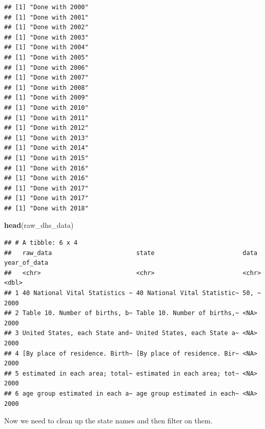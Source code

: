 \documentclass[
]{book}
\newenvironment{Shaded}{\begin{snugshade}}{\end{snugshade}}
\newcommand{\KeywordTok}[1]{\textcolor[rgb]{0.13,0.29,0.53}{\textbf{#1}}}
\newcommand{\NormalTok}[1]{#1}
\begin{document}
\begin{verbatim}
## [1] "Done with 2000"
## [1] "Done with 2001"
## [1] "Done with 2002"
## [1] "Done with 2003"
## [1] "Done with 2004"
## [1] "Done with 2005"
## [1] "Done with 2006"
## [1] "Done with 2007"
## [1] "Done with 2008"
## [1] "Done with 2009"
## [1] "Done with 2010"
## [1] "Done with 2011"
## [1] "Done with 2012"
## [1] "Done with 2013"
## [1] "Done with 2014"
## [1] "Done with 2015"
## [1] "Done with 2016"
## [1] "Done with 2016"
## [1] "Done with 2017"
## [1] "Done with 2017"
## [1] "Done with 2018"
\end{verbatim}

\begin{Shaded}
\begin{Highlighting}[]
\KeywordTok{head}\NormalTok{(raw_dhs_data)}
\end{Highlighting}
\end{Shaded}

\begin{verbatim}
## # A tibble: 6 x 4
##   raw_data                       state                        data  year_of_data
##   <chr>                          <chr>                        <chr>        <dbl>
## 1 40 National Vital Statistics ~ 40 National Vital Statistic~ 50, ~         2000
## 2 Table 10. Number of births, b~ Table 10. Number of births,~ <NA>          2000
## 3 United States, each State and~ United States, each State a~ <NA>          2000
## 4 [By place of residence. Birth~ [By place of residence. Bir~ <NA>          2000
## 5 estimated in each area; total~ estimated in each area; tot~ <NA>          2000
## 6 age group estimated in each a~ age group estimated in each~ <NA>          2000
\end{verbatim}

Now we need to clean up the state names and then filter on them.
\end{document}
